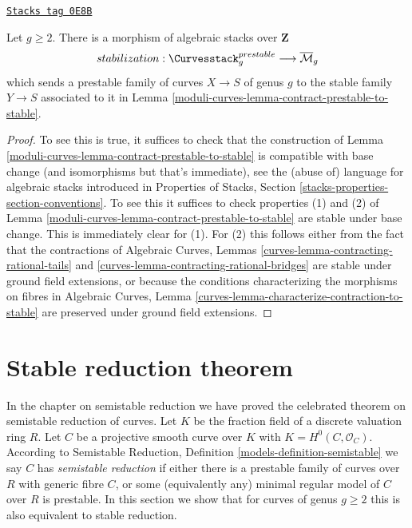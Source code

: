 \begin{lemma}
\label{moduli-curves-lemma-stabilization-morphism}
\href{https://stacks.math.columbia.edu/tag/0E8B}{\texttt{Stacks tag 0E8B}}

Let $g \geq 2$. There is a morphism of algebraic stacks over $\mathbf{Z}$
$$
stabilization :
\Curvesstack^{prestable}_g
\longrightarrow
\overline{\mathcal{M}}_g
$$
which sends a prestable family of curves $X \to S$ of genus $g$
to the stable family $Y \to S$ associated to it in
Lemma \ref{moduli-curves-lemma-contract-prestable-to-stable}.
\end{lemma}

\begin{proof}
To see this is true, it suffices to check that the construction of
Lemma \ref{moduli-curves-lemma-contract-prestable-to-stable}
is compatible with base change (and isomorphisms but that's immediate),
see the (abuse of) language for algebraic stacks introduced
in Properties of Stacks, Section \ref{stacks-properties-section-conventions}.
To see this it suffices to check properties (1) and (2) of
Lemma \ref{moduli-curves-lemma-contract-prestable-to-stable} are stable
under base change. This is immediately clear for (1).
For (2) this follows either from the fact that the contractions of
Algebraic Curves, Lemmas \ref{curves-lemma-contracting-rational-tails} and
\ref{curves-lemma-contracting-rational-bridges}
are stable under ground field extensions, or
because the conditions characterizing the morphisms on fibres in
Algebraic Curves, Lemma \ref{curves-lemma-characterize-contraction-to-stable}
are preserved under ground field extensions.
\end{proof}

\section{Stable reduction theorem}
\label{moduli-curves-section-stable-reduction}
In the chapter on semistable reduction we have proved the celebrated
theorem on semistable reduction of curves. Let $K$ be the fraction
field of a discrete valuation ring $R$. Let $C$ be a projective smooth
curve over $K$ with $K = H^0(C, \mathcal{O}_C)$. According to
Semistable Reduction, Definition \ref{models-definition-semistable}
we say $C$ has {\it semistable reduction} if either
there is a prestable family of curves over $R$ with generic fibre $C$, or
some (equivalently any) minimal regular model of $C$ over $R$ is prestable.
In this section we show that for curves of genus $g \geq 2$
this is also equivalent to stable reduction.

